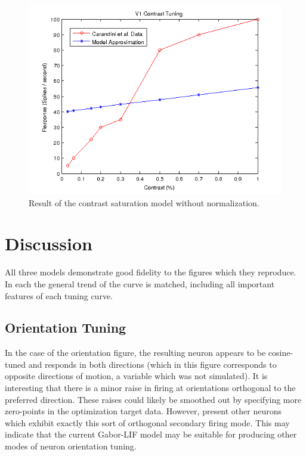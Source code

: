 \documentclass{article}
\begin{document}
\begin{figure}[h]
\begin{center}
\includegraphics[width=4.75in]{figures/contrast_tuning_no_norm.png}
\caption{ Result of the contrast saturation model without normalization.}
\label{fig:cnonorm}
\end{center}
\end{figure}

\section{Discussion}
All three models demonstrate good fidelity to the figures which they reproduce. In each the general trend of the curve is matched, including all important features of each tuning curve. 

\subsection{Orientation Tuning}
In the case of the orientation figure, the resulting neuron appears to be cosine-tuned and responds in both directions (which in this figure corresponds to opposite directions of motion, a variable which was not simulated). It is interesting that there is a minor raise in firing at orientations orthogonal to the preferred direction. These raises could likely be smoothed out by specifying more zero-points in the optimization target data. However, \citet{devalois82} present other neurons which exhibit exactly this sort of orthogonal secondary firing mode. This may indicate that the current Gabor-LIF model may be suitable for producing other modes of neuron orientation tuning.
\end{document}
